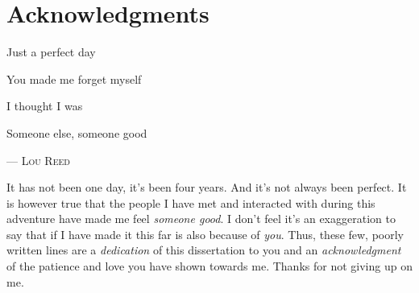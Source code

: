 
\chapter*{Acknowledgments}

\epigraph{Just a perfect day

You made me forget myself

I thought I was

Someone else, someone good
}{
--- \textsc{Lou Reed}}

It has not been one day, it's been four years.
And it's not always been perfect.
It is however true that the people I have met and interacted with during
this adventure have made me feel \emph{someone good}.
I don't feel it's an exaggeration to say that if I have made it this far
is also because of \emph{you}.
Thus, these few, poorly written lines are
a \emph{dedication} of this dissertation to you
and an \emph{acknowledgment}
of the patience and love you have shown towards me.
Thanks for not giving up on me.

